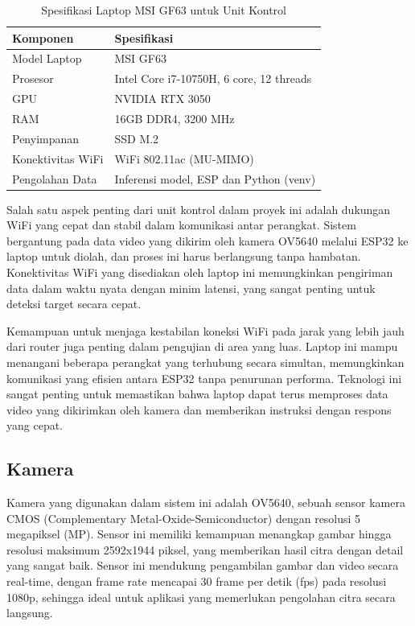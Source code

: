 \begin{table}[H]
  \centering
  \begin{tabular}{|l|l|}
  \hline
  \textbf{Komponen}       & \textbf{Spesifikasi}                     \\ \hline
  Model Laptop            & MSI GF63                                 \\ \hline
  Prosesor                & Intel Core i7-10750H, 6 core, 12 threads \\ \hline
  GPU                     & NVIDIA RTX 3050                          \\ \hline
  RAM                     & 16GB DDR4, 3200 MHz                      \\ \hline
  Penyimpanan             & SSD M.2                                  \\ \hline
  Konektivitas WiFi       & WiFi 802.11ac (MU-MIMO)                  \\ \hline
  Pengolahan Data         & Inferensi model, ESP dan Python (venv)   \\ \hline
  \end{tabular}
  \caption{Spesifikasi Laptop MSI GF63 untuk Unit Kontrol}
\end{table}

Salah satu aspek penting dari unit kontrol dalam proyek ini adalah dukungan WiFi yang cepat dan stabil dalam komunikasi antar perangkat. Sistem bergantung pada data video yang dikirim oleh kamera OV5640 melalui ESP32 ke laptop untuk diolah, dan proses ini harus berlangsung tanpa hambatan. Konektivitas WiFi yang disediakan oleh laptop ini memungkinkan pengiriman data dalam waktu nyata dengan minim latensi, yang sangat penting untuk deteksi target secara cepat.

Kemampuan untuk menjaga kestabilan koneksi WiFi pada jarak yang lebih jauh dari router juga penting dalam pengujian di area yang luas. Laptop ini mampu menangani beberapa perangkat yang terhubung secara simultan, memungkinkan komunikasi yang efisien antara ESP32 tanpa penurunan performa. Teknologi ini sangat penting untuk memastikan bahwa laptop dapat terus memproses data video yang dikirimkan oleh kamera dan memberikan instruksi dengan respons yang cepat.

\subsection{Kamera}
\label{subsec:kamera}
Kamera yang digunakan dalam sistem ini adalah OV5640, sebuah sensor kamera CMOS (Complementary Metal-Oxide-Semiconductor) dengan resolusi 5 megapiksel (MP). Sensor ini memiliki kemampuan menangkap gambar hingga resolusi maksimum 2592x1944 piksel, yang memberikan hasil citra dengan detail yang sangat baik. Sensor ini mendukung pengambilan gambar dan video secara real-time, dengan frame rate mencapai 30 frame per detik (fps) pada resolusi 1080p, sehingga ideal untuk aplikasi yang memerlukan pengolahan citra secara langsung.

